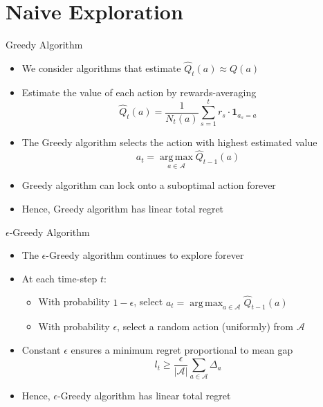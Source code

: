 \section{Naive Exploration}
\begin{frame}{Greedy Algorithm}
\begin{itemize}
    \item We consider algorithms that estimate $\hat{Q}_t(a) \approx Q(a)$
    \item Estimate the value of each action by rewards-averaging
    \[
        \hat{Q}_t(a) = \frac{1}{N_t(a)} \sum_{s=1}^{t} r_s \cdot \mathbf{1}_{a_s = a}
    \]
    \item The Greedy algorithm selects the action with highest estimated value
    \[
        a_t = \operatorname*{arg\,max}_{a \in \mathcal{A}} \hat{Q}_{t-1}(a)
    \]
    \item Greedy algorithm can lock onto a suboptimal action forever
    \item Hence, Greedy algorithm has linear total regret
\end{itemize}
\end{frame}

\begin{frame}{$\epsilon$-Greedy Algorithm}
\begin{itemize}
    \item The $\epsilon$-Greedy algorithm continues to explore forever
    \item At each time-step $t$:
    \begin{itemize}
        \item With probability $1 - \epsilon$, select $a_t = \operatorname*{arg\,max}_{a \in \mathcal{A}} \hat{Q}_{t-1}(a)$
        \item With probability $\epsilon$, select a random action (uniformly) from $\mathcal{A}$
    \end{itemize}
    \item Constant $\epsilon$ ensures a minimum regret proportional to mean gap
    \[
        l_t \geq \frac{\epsilon}{|\mathcal{A}|} \sum_{a \in \mathcal{A}} \Delta_a
    \]
    \item Hence, $\epsilon$-Greedy algorithm has linear total regret
\end{itemize}
\end{frame}

